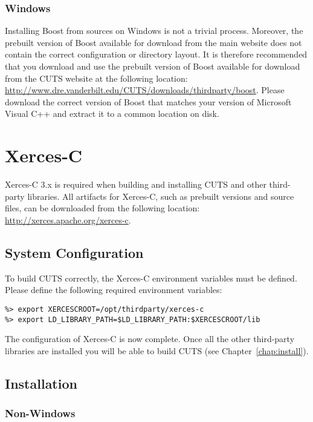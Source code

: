 \subsubsection{Windows}

Installing Boost from sources on Windows is not a trivial process. 
Moreover, the prebuilt version of Boost available for download from 
the main website does not contain the correct configuration or directory
layout. It is therefore recommended that you download and use the prebuilt 
version of Boost available for download from the CUTS website at the 
following location:
\url{http://www.dre.vanderbilt.edu/CUTS/downloads/thirdparty/boost}. Please download
the correct version of Boost that matches your version of Microsoft Visual
C++ and extract it to a common location on disk.

\section{Xerces-C}
\label{sec:thirdparty-xercesc}

Xerces-C 3.x is required when building and installing CUTS and other third-party
libraries. All artifacts for Xerces-C, such as prebuilt versions and source files, 
can be downloaded from the following location: \url{http://xerces.apache.org/xerces-c}. 

\subsection{System Configuration}

To build CUTS correctly, the Xerces-C environment variables must be defined. Please 
define the following required environment variables:
\begin{lstlisting}
%> export XERCESCROOT=/opt/thirdparty/xerces-c
%> export LD_LIBRARY_PATH=$LD_LIBRARY_PATH:$XERCESCROOT/lib
\end{lstlisting}
The configuration of Xerces-C is now complete. Once all the other
third-party libraries are installed you will be able to build CUTS
(see Chapter~\ref{chap:install}).

\subsection{Installation}

\subsubsection{Non-Windows}
 
